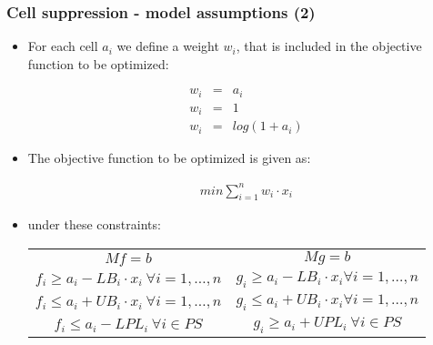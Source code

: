 \begin{frame}\frametitle{Cell suppression - model assumptions (2)}
	\begin{itemize}
		\item For each cell $a_i$ we define a weight $w_i$, that is included in the objective function to be optimized:
		\vspace{-0.15cm}
		\begin{scriptsize} \begin{eqnarray*}
			w_i &=& a_i  \\
			w_i &=& 1  \\
			w_i &=& log(1+a_i)
	\end{eqnarray*}	\end{scriptsize} \pause

	\vspace{-0.3cm}
	\item The objective function to be optimized is given as:
	\vspace{-0.15cm}
		\begin{scriptsize} \begin{eqnarray*}
			min \sum_{i=1}^n w_i \cdot x_i
	\end{eqnarray*}	\end{scriptsize} \pause
	\vspace{-0.15cm}
	\item under these constraints:
	\vspace{-0.1cm}
			\begin{scriptsize}
			\begin{center}
				\begin{tabular}{cc}
				$M f = b$ & $M g = b$ \\
				$f_i \geq a_i - LB_i \cdot x_i ~ \forall i=1,\ldots,n$ &  $g_i \geq a_i - LB_i \cdot x_i \forall i=1,\ldots,n$\\
				$f_i \leq a_i + UB_i \cdot x_i ~ \forall i=1,\ldots,n$ &  $g_i \leq a_i + UB_i \cdot x_i \forall i=1,\ldots,n$ \\
				$f_i \leq a_i - LPL_i ~ \forall i \in PS$ & $g_i \geq a_i + UPL_i ~ \forall i \in PS$
				\end{tabular}
			\end{center}
			\end{scriptsize}
	\end{itemize}
\end{frame}


